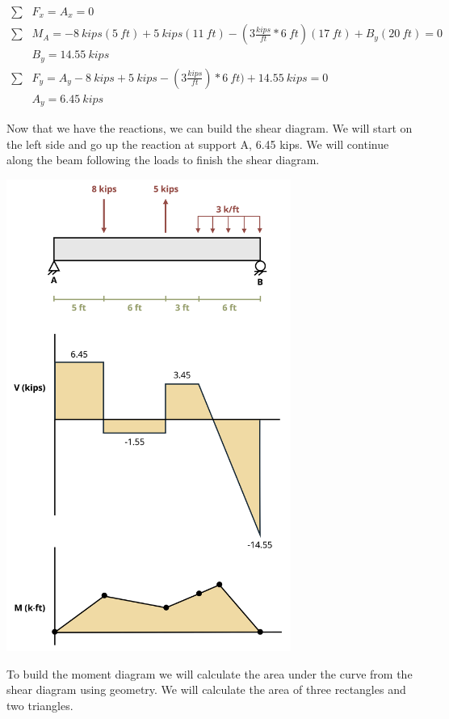 \documentclass[
  letterpaper,
  DIV=11,
  numbers=noendperiod]{scrreprt}
\theoremstyle{definition}
\theoremstyle{remark}
\begin{document}
\begin{tcolorbox}
\begin{tcolorbox}
\[
\begin{aligned}
\sum& F_x =A_x =0\\
\sum& M_A =-8{~kips}(5{~ft})+5{~kips}(11{~ft})-(3\frac{kips}{ft}*6{~ft})(17{~ft})+B_y(20{~ft})=0 \\
&B_y =14.55{~kips} \\
\sum& F_y=A_y-8{~kips}+5{~kips}-(3\frac{kips}{ft})*6{~ft})+14.55{~kips}=0 \\
&A_y=6.45{~kips}
\end{aligned}
\]

Now that we have the reactions, we can build the shear diagram. We will
start on the left side and go up the reaction at support A, 6.45 kips.
We will continue along the beam following the loads to finish the shear
diagram.

\begin{center}
\includegraphics[width=3.66667in,height=\textheight]{images/CH9 PNGs/Example 9.3 part 3.png}
\end{center}

To build the moment diagram we will calculate the area under the curve
from the shear diagram using geometry. We will calculate the area of
three rectangles and two triangles.


\end{tcolorbox}
\end{tcolorbox}
\end{document}

